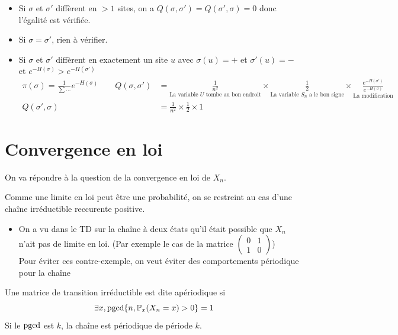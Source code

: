 \documentclass[]{report}
\begin{document}
    \begin{itemize}
        \item Si $\sigma$ et $\sigma'$ diffèrent en $>1$ sites, on a $Q(\sigma,\sigma')=Q(\sigma',\sigma)=0$ donc l'égalité est vérifiée.
        \item Si $\sigma=\sigma'$, rien à vérifier.
        \item Si $\sigma$ et $\sigma'$ diffèrent en exactement un site $u$ avec $\sigma(u)=+$ et $\sigma'(u)=-$ et $e^{-H(\sigma)}>e^{-H(\sigma')}$
        \begin{align*}
            \pi(\sigma)=\frac{1}{\sum\ldots}e^{-H(\sigma)}\qquad Q(\sigma,\sigma')&=\underset{\text{La variable $U$ tombe au bon endroit}}{\frac{1}{n^2}}\times \underset{\text{La variable $S_n$ a le bon signe}}{\frac{1}{2}}\times \underset{\text{La modification}}{\frac{e^{-H(\sigma')}}{e^{-H(\sigma)}}}\\
            Q(\sigma',\sigma)&=\frac{1}{n^2}\times \frac{1}{2}\times 1
        \end{align*}
    \end{itemize}

    \section{Convergence en loi}

    On va répondre à la question de la convergence en loi de $X_n$.

    \begin{re}{}{}
        Comme une limite en loi peut être une probabilité, on se restreint au cas d'une chaîne irréductible reccurente positive.
        \begin{itemize}
            \item On a vu dans le TD sur la chaîne à deux états qu'il était possible que $X_n$ n'ait pas de limite en loi. (Par exemple le cas de la matrice $\left(\begin{matrix}
                0& 1\\
                1&0
            \end{matrix}\right)$)\\
            Pour éviter ces contre-exemple, on veut éviter des comportements périodique pour la chaîne
        \end{itemize}
    \end{re}

    \begin{df}{}{}
        Une matrice de transition irréductible est dite apériodique si
        \[\exists x,\text{pgcd}\{n,\mathbb{P}_x(X_n=x)>0\}=1\]
        Si le $\text{pgcd}$ est $k$, la chaîne est périodique de période $k$.
    \end{df}
\end{document}
